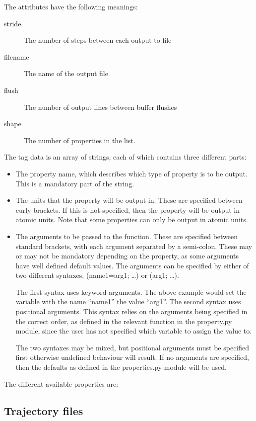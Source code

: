 \documentclass[11pt,english,fleqn]{report}
\begin{document}
The attributes have the following meanings:
\begin{description}
\item [{stride}] The number of steps between each output to file
\item [{filename}] The name of the output file
\item [{flush}] The number of output lines between buffer flushes
\item [{shape}] The number of properties in the list.
\end{description}
The tag data is an array of strings, each of which contains three
different parts:
\begin{itemize}
\item The property name, which describes which type of property is to be
output. This is a mandatory part of the string.
\item The units that the property will be output in. These are specified
between curly brackets. If this is not specified, then the property
will be output in atomic units. Note that some properties can only
be output in atomic units.
\item The arguments to be passed to the function. These are specified between
standard brackets, with each argument separated by a semi-colon. These
may or may not be mandatory depending on the property, as some arguments
have well defined default values. The arguments
can be specified by either of two different syntaxes, (name1=arg1;
\ldots ) or (arg1; \ldots ). 

The first syntax uses keyword arguments. The above example would set the variable
with the name {}``name1'' the value {}``arg1''. 
The second syntax uses positional arguments. This syntax
relies on the arguments being specified in the correct order, as defined
in the relevant function in the property.py module, since the user has
not specified which variable to assign the value to. 

The two syntaxes
may be mixed, but positional arguments must be specified first otherwise
undefined behaviour will result. If no arguments are specified, then
the defaults as defined in the properties.py module will be used.
\end{itemize}
The different available properties are:



\subsection{Trajectory files} \label{trajectories}
\end{document}
